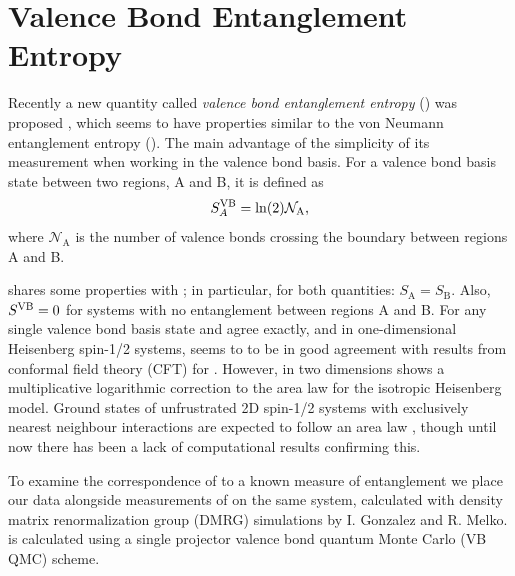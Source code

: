 \chapter{Valence Bond Entanglement Entropy}
Recently a new quantity called {\it{valence bond entanglement entropy}} (\vB) was proposed \cite{Ian1, Alet, Chh},  
which seems to have properties similar to the von Neumann entanglement entropy (\vN).
The main advantage of \vb the simplicity of its measurement when working in the valence bond basis.
For a valence bond basis state \vb between two regions, A and B, it is defined as 
\begin{equation}
S^{\text{VB}}_A = \ln({2})\mathcal{N}_{\text{A}},
\end{equation} 
where $\mathcal{N}_{\text{A}}$ is the number of valence bonds crossing the boundary between
regions A and B.


\vb shares some properties with \vN; in particular, for both quantities: $S_{\text{A}} = S_{\text{B}}$.
Also, $S^{\text{VB}} = 0$ for systems with no entanglement between regions A and B.
For any single valence bond basis state \vb and \vn agree exactly, and
in one-dimensional Heisenberg spin-1/2 systems, \vb seems to to be in good agreement with
results from conformal field theory (CFT) for \vN.
However, in two dimensions \vb shows a multiplicative logarithmic correction to the area law
for the isotropic Heisenberg model.  
Ground states of unfrustrated 2D spin-1/2 systems with exclusively nearest neighbour interactions
are expected to follow an area law \cite{ALreview, DeBeaudrap2010}, though until now there has been a lack of computational results confirming this.


To examine the correspondence of \vb to a known measure of entanglement we place our \vb data alongside measurements of \vn
on the same system, calculated with density matrix renormalization group (DMRG) simulations by I. Gonzalez and R. Melko.
\vb is calculated using a single projector valence bond quantum Monte Carlo (VB QMC) scheme.




